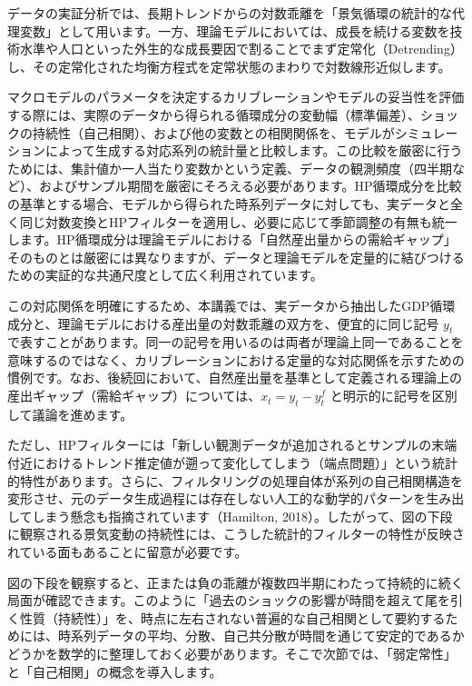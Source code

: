 \documentclass[
  japanese,
  lualatex,
  ja=standard,
  12pt,
  a4paper]{ltjsarticle}
\begin{document}
データの実証分析では、長期トレンドからの対数乖離を「景気循環の統計的な代理変数」として用います。一方、理論モデルにおいては、成長を続ける変数を技術水準や人口といった外生的な成長要因で割ることでまず定常化（Detrending）し、その定常化された均衡方程式を定常状態のまわりで対数線形近似します。


マクロモデルのパラメータを決定するカリブレーションやモデルの妥当性を評価する際には、実際のデータから得られる循環成分の変動幅（標準偏差）、ショックの持続性（自己相関）、および他の変数との相関関係を、モデルがシミュレーションによって生成する対応系列の統計量と比較します。この比較を厳密に行うためには、集計値か一人当たり変数かという定義、データの観測頻度（四半期など）、およびサンプル期間を厳密にそろえる必要があります。HP循環成分を比較の基準とする場合、モデルから得られた時系列データに対しても、実データと全く同じ対数変換とHPフィルターを適用し、必要に応じて季節調整の有無も統一します。HP循環成分は理論モデルにおける「自然産出量からの需給ギャップ」そのものとは厳密には異なりますが、データと理論モデルを定量的に結びつけるための実証的な共通尺度として広く利用されています。

この対応関係を明確にするため、本講義では、実データから抽出したGDP循環成分と、理論モデルにおける産出量の対数乖離の双方を、便宜的に同じ記号
\(y_t\)
で表すことがあります。同一の記号を用いるのは両者が理論上同一であることを意味するのではなく、カリブレーションにおける定量的な対応関係を示すための慣例です。なお、後続回において、自然産出量を基準として定義される理論上の産出ギャップ（需給ギャップ）については、\(x_t = y_t - y_t^f\)
と明示的に記号を区別して議論を進めます。

ただし、HPフィルターには「新しい観測データが追加されるとサンプルの末端付近におけるトレンド推定値が遡って変化してしまう（端点問題）」という統計的特性があります。さらに、フィルタリングの処理自体が系列の自己相関構造を変形させ、元のデータ生成過程には存在しない人工的な動学的パターンを生み出してしまう懸念も指摘されています（Hamilton,
2018）。したがって、図の下段に観察される景気変動の持続性には、こうした統計的フィルターの特性が反映されている面もあることに留意が必要です。

図の下段を観察すると、正または負の乖離が複数四半期にわたって持続的に続く局面が確認できます。このように「過去のショックの影響が時間を超えて尾を引く性質（持続性）」を、時点に左右されない普遍的な自己相関として要約するためには、時系列データの平均、分散、自己共分散が時間を通じて安定的であるかどうかを数学的に整理しておく必要があります。そこで次節では、「弱定常性」と「自己相関」の概念を導入します。
\end{document}
